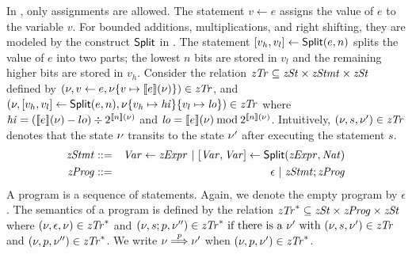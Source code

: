 In \zdsl, only assignments are allowed.
The statement $v \leftarrow e$ assigns the value of $e$
to the variable $v$. For bounded additions, multiplications, and right
shifting, they are modeled by the construct $\mbox{\textsf{Split}}$ in \zdsl.
The statement ${[}{v_h}, {v_l}{]} \leftarrow
\mbox{\textsf{Split}}(e, n)$ splits the value of $e$ into two parts;
the lowest $n$ bits are stored in $v_l$ and the remaining higher bits
are stored in $v_h$.
Consider the relation $\mathit{zTr} \subseteq \mathit{zSt} \times \mathit{zStmt} \times \mathit{zSt}$ defined
by $(\nu, v \leftarrow e, \nu\{{v} \mapsto {[\![{e}]\!](\nu)}\}) \in \mathit{zTr}$, and
  $(\nu, {[}{v_h}, {v_l}{]} \leftarrow \mbox{\textsf{Split}} (e, n),
  \nu\{{v_h} \mapsto {\mathit{hi}}\}\{{v_l} \mapsto {\mathit{lo}}\}) \in \mathit{zTr}$
where
$\mathit{hi} = ([\![{e}]\!](\nu) - lo) \div 2^{[\![{n}]\!](\nu)}$ and
$\mathit{lo} = [\![{e}]\!](\nu) \mathbin{\textmd{mod}} 2^{[\![{n}]\!](\nu)}$.
Intuitively, $(\nu, s, \nu') \in \mathit{zTr}$ denotes that the state $\nu$ transits to
the state $\nu'$ after executing the statement $s$.
\begin{eqnarray*}
  \mathit{zStmt} & ::= & \mathit{Var} \leftarrow \mathit{zExpr}
            \ |\  {[}{\mathit{Var}}, {\mathit{Var}}{]} \leftarrow \mbox{\textsf{Split}} (\mathit{zExpr}, \mathit{Nat}) \\
  \mathit{zProg} & ::= & \epsilon \ |\ \mathit{zStmt}; \mathit{zProg}
\end{eqnarray*}
A program is a sequence of statements. Again, we denote the empty program by
$\epsilon$.
The semantics of a program is defined by the relation
$\mathit{zTr}^* \subseteq \mathit{zSt} \times \mathit{zProg} \times \mathit{zSt}$ where
$(\nu, \epsilon, \nu) \in \mathit{zTr}^*$ and
$(\nu, s; p, \nu'') \in \mathit{zTr}^* \textmd{ if }
    \textmd{there is a } \nu' \textmd{ with }
    (\nu, s, \nu') \in \mathit{zTr}$ and
    $(\nu, p, \nu'') \in \mathit{zTr}^*$.
We write $\nu \overset{p}{\Longrightarrow} \nu'$ when $(\nu, p, \nu') \in \mathit{zTr}^*$.



